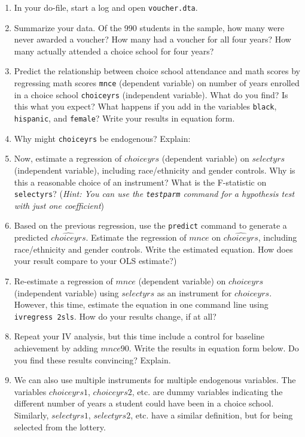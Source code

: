 \documentclass[11pt]{article}
\begin{document}
\begin{enumerate}
\def\labelenumi{\arabic{enumi}.}
\item
  In your do-file, start a log and open \texttt{voucher.dta}.
\item
  Summarize your data. Of the 990 students in the sample, how many were
  never awarded a voucher? How many had a voucher for all four years?
  How many actually attended a choice school for four years?
\item
  Predict the relationship between choice school attendance and math
  scores by regressing math scores \texttt{mnce} (dependent variable) on
  number of years enrolled in a choice school \texttt{choiceyrs}
  (independent variable). What do you find? Is this what you expect?
  What happens if you add in the variables \texttt{black},
  \texttt{hispanic}, and \texttt{female}? Write your results in equation
  form.
\item
  Why might \texttt{choiceyrs} be endogenous? Explain:
\item
  Now, estimate a regression of \(choiceyrs\) (dependent variable) on
  \(selectyrs\) (independent variable), including race/ethnicity and
  gender controls. Why is this a reasonable choice of an instrument?
  What is the F-statistic on \texttt{selectyrs}? (\emph{Hint: You can
  use the \texttt{testparm} command for a hypothesis test with just one
  coefficient})
\item
  Based on the previous regression, use the \texttt{predict} command to
  generate a predicted \(\widehat{choiceyrs}\). Estimate the regression
  of \(mnce\) on \(\widehat{choiceyrs}\), including race/ethnicity and
  gender controls. Write the estimated equation. How does your result
  compare to your OLS estimate?)
\item
  Re-estimate a regression of \(mnce\) (dependent variable) on
  \(choiceyrs\) (independent variable) using \(selectyrs\) as an
  instrument for \(choiceyrs\). However, this time, estimate the
  equation in one command line using \texttt{ivregress\ 2sls}. How do
  your results change, if at all?
\item
  Repeat your IV analysis, but this time include a control for baseline
  achievement by adding \(mnce90\). Write the results in equation form
  below. Do you find these results convincing? Explain.
\item
  We can also use multiple instruments for multiple endogenous
  variables. The variables \(choiceyrs1\), \(choiceyrs2\), etc. are
  dummy variables indicating the different number of years a student
  could have been in a choice school. Similarly, \(selectyrs1\),
  \(selectyrs2\), etc. have a similar definition, but for being selected
  from the lottery.


\end{enumerate}
\end{document}
